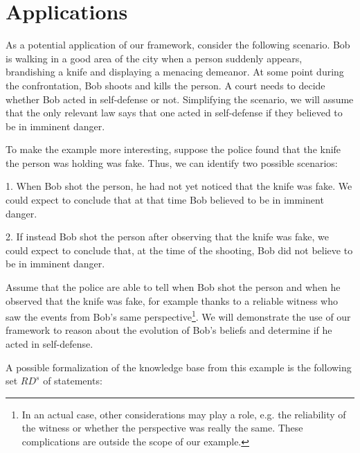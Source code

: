 \documentclass{article}
\begin{document}
\section{Applications} 

As a potential application of our framework, consider the following scenario. Bob is walking in a good area of the city when a person suddenly appears, brandishing a knife and displaying a menacing demeanor. At some point during the confrontation, Bob shoots and kills the person. A court needs to decide whether Bob acted in self-defense or not. Simplifying the scenario, we will assume that the only relevant law says that one acted in self-defense if they believed to be in imminent danger.

To make the example more interesting, suppose the police found that the knife the person was holding was fake. Thus, we can identify two possible scenarios:

    1. When Bob shot the person, he had not yet noticed that the knife was fake. We could expect to conclude that at that time Bob believed to be in imminent danger.

    2. If instead Bob shot the person after observing that the knife was fake, we could expect to conclude that, at the time of the shooting, Bob did not believe to be in imminent danger.

Assume that the police are able to tell when Bob shot the person and when he observed that the knife was fake, for example thanks to a reliable witness who saw the events from Bob's same perspective\footnote{In an actual case, other considerations may play a role, e.g. the reliability of the witness or whether the perspective was really the same. These complications are outside the scope of our example.}. We will demonstrate the use of our framework to reason about the evolution of Bob's beliefs and determine if he acted in self-defense.

A possible formalization of the knowledge base from this example is the following set $RD^s$ of statements:
\end{document}
